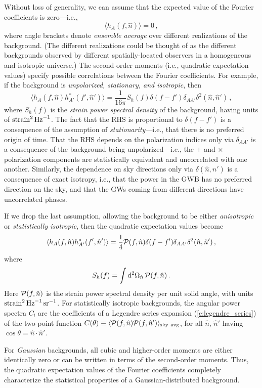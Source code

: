\documentclass[11pt]{article}
\numberwithin{equation}{section}
\def\be{\begin{equation}}
\def\ee{\end{equation}}
\def\D{{\rm d}}
\begin{document}
Without loss of generality, we can assume that the 
expected value of the Fourier coefficients is 
zero---i.e.,
%
\be
\langle h_A(f,\hat n)\rangle=0\,,
\ee
%
where angle brackets denote {\em ensemble average}
over different realizations of the background.
(The different realizations could be thought of 
as the different backgrounds observed by
different spatially-located observers in a homogeneous 
and isotropic universe.)
The second-order moments (i.e., quadratic expectation 
values) specify possible correlations between the 
Fourier coefficients.
For example, if the background is 
{\em unpolarized, stationary, and isotropic}, then
%
\be
\langle h_A(f,\hat n)h_{A'}^*(f',\hat n')\rangle
=\frac{1}{16\pi} S_h(f)\delta(f-f')\delta_{AA'}\delta^2(\hat n,\hat n')\,,
\label{e:quad_iso}
\ee
%
where $S_h(f)$ is the {\em strain power spectral 
density} of the background, 
having units of ${\rm strain}^2\,{\rm Hz}^{-1}$.
The fact that the RHS is proportional 
to $\delta(f-f')$ is a consequence of the assumption
of {\em stationarity}---i.e., that there is no 
preferred origin of time.
That the RHS depends on the polarization indices
only via  $\delta_{AA'}$ is a consequence of the 
background being unpolarized---i.e., the $+$ and $\times$ 
polarization components are statistically
equivalent and uncorrelated with one another.
Similarly, the dependence on sky directions only via 
$\delta(\hat n,\hat n')$ is a consequence of exact 
isotropy,
i.e., that the power in the GWB has no preferred
direction on the sky, and that the GWs coming from
different directions have uncorrelated phases.

If we drop the last assumption, allowing the background
to be either {\em anisotropic} or {\em statistically 
isotropic}, then the quadratic expectation values become
%
\be
\langle h_A(f,\hat n)h_{A'}^*(f',\hat n')\rangle
=\frac{1}{4} {\cal P}(f,\hat n)\delta(f-f')\delta_{AA'}\delta^2(\hat n,\hat n')\,,
\label{e:quad_aniso}
\ee
%
where
%
\be
S_h(f) = \int \D^2\Omega_{\hat n}\,{\cal P}(f,\hat n)\,.
\ee
%
Here ${\cal P}(f,\hat n)$ is the strain power
spectral density per unit solid angle, with 
units ${\rm strain}^2\,{\rm Hz}^{-1}\,{\rm sr}^{-1}$.
For statistically isotropic backgrounds, the angular power 
spectra $C_l$ are the coefficients of a Legendre 
series expansion (\ref{e:legendre_series})
of the two-point function 
$C(\theta)\equiv 
\langle {\cal P}(f,\hat n){\cal P}(f,\hat n')\rangle_{\rm sky\ avg}$, 
for all $\hat n$, $\hat n'$ having 
$\cos\theta = \hat n\cdot \hat n'$.

For {\em Gaussian} backgrounds, all cubic 
and higher-order moments are either identically zero 
or can be written in terms of the second-order moments.
Thus, the quadratic expectation values of the Fourier
coefficients completely characterize the statistical
properties of a Gaussian-distributed background.
\end{document}
